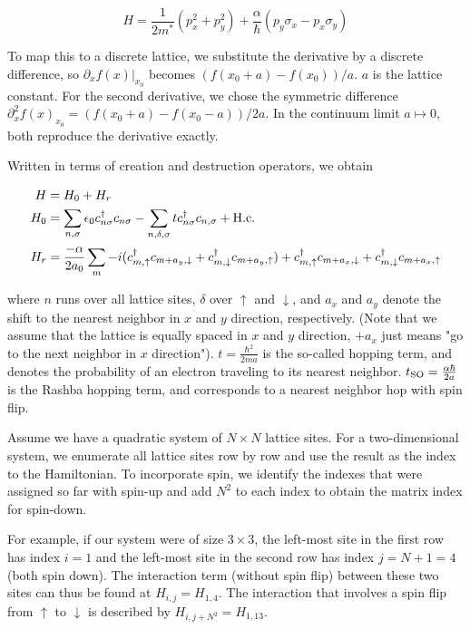 \documentclass[11pt,twoside]{book}
\newcommand{\inp}[1]{\ensuremath{\left(#1\right)}}
\newcommand{\dell}{\partial}
\newcommand{\tso}{\ensuremath{t_{\textnormal{SO}}}}
\begin{document}
\begin{equation}
    H = \frac{1}{2 m^*} (p_x^2 + p_y^2) +
    \frac{\alpha}{\hbar} \inp{p_y\sigma_x - p_x\sigma_y}
\end{equation}

To map this to a discrete lattice, we substitute the derivative by a discrete
difference, so $\dell_x f(x)|_{x_0}$ becomes $(f(x_0+a) - f(x_0))/a$. $a$ is
the lattice constant. For the
second derivative, we chose the symmetric difference $\dell_x^2 f(x)_{x_0} =
(f(x_0+a) - f(x_0-a))/2a$. In the continuum limit $a \mapsto 0$, both reproduce
the derivative exactly.

Written in terms of creation and destruction operators, we obtain

\begin{align}
    H   &= H_0 + H_r\\
    H_0 &= \sum_{n,\sigma} \epsilon_0 c^{\dagger}_{n\sigma} c_{n\sigma}
           - \sum_{n,\delta,\sigma} t c^\dagger_{n\sigma} c_{n,\sigma} +
           \textnormal{H.c.}\\
    H_r &= \frac{-\alpha}{2 a_0} \sum_m
        -i( c^\dagger_{m,\uparrow} c_{m+a_y,\downarrow}
            + c^\dagger_{m,\downarrow} c_{m+a_y,\uparrow})
         + c^\dagger_{m,\uparrow} c_{m+a_x,\downarrow}
            + c^\dagger_{m,\downarrow} c_{m+a_x,\uparrow}
\end{align}

where $n$ runs over all lattice sites, $\delta$ over $\uparrow$ and
$\downarrow$, and $a_x$ and $a_y$ denote the shift to the nearest neighbor in
$x$ and $y$ direction, respectively. (Note that we assume that the lattice is
equally spaced in $x$ and $y$ direction, $+a_x$ just means "go to the next
neighbor in $x$ direction"). $t = \frac{\hbar^2}{2ma}$ is the so-called hopping term, and denotes the
probability of an electron traveling to its nearest neighbor.
$\tso = \frac{\alpha \hbar}{2a}$ is the
Rashba hopping term, and corresponds to a nearest neighbor hop with spin
flip.

Assume we have a quadratic system of $N \times N$ lattice sites.
For a two-dimensional system, we enumerate all lattice sites row by row and
use the result as the index to the Hamiltonian. To incorporate spin, we
identify the indexes that were assigned so far with spin-up and add $N^2$ to
each index to obtain the matrix index for spin-down.

For example, if our system were of size $3 \times 3$, the left-most site in the
first row has index $i = 1$ and the left-most site in the second row has
index $j = N + 1 = 4$ (both spin down). The interaction term (without spin
flip) between these two sites can thus be found at $H_{i,j} = H_{1,4}$. The
interaction that involves a spin flip from $\uparrow$ to $\downarrow$ is
described by $H_{i, j+N^2} = H_{1, 13}$.
\end{document}
